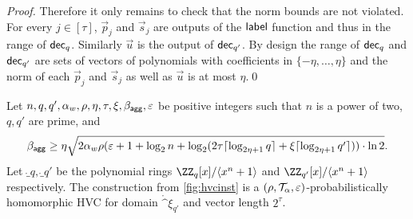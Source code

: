 \begin{proof}
Therefore it only remains to check that the norm bounds are not violated. For every $j\in[\tau]$, $\vec{p}_j$ and $\vec{s}_j$ are outputs of the $\mathsf{label}$ function and thus in the range of $\mathsf{dec}_q$.
Similarly $\vec{u}$ is the output of $\mathsf{dec}_{q'}$.
By design the range of $\mathsf{dec}_q$ and $\mathsf{dec}_{q'}$ are sets of vectors of polynomials with coefficients in $\{-\eta,\dots,\eta\}$ and the norm of each $\vec{p}_j$ and $\vec{s}_j$ as well as $\vec{u}$ is at most $\eta$.\qed
\end{proof}

\begin{lemma}\label{lem:hvcprobhom}
  Let $n,q,q',\alpha_w,\rho,\eta,\tau,\xi,\beta_{\mathsf{agg}},\varepsilon$ be positive integers such that $n$ is a power of two, $q,q'$ are prime, and \[\beta_{\mathsf{agg}} \geq \eta\sqrt{2\alpha_w\rho(\varepsilon+1+\log_2 n + \log_2(2\tau \lceil\log_{2\eta+1}q\rceil + \xi\lceil\log_{2\eta+1}q'\rceil))\cdot\ln2}.\]
  Let $\ring_q,\ring_{q'}$ be the polynomial rings $\ZZ_q[x]/\langle x^n+1\rangle$ and $\ZZ_{q'}[x]/\langle x^n+1\rangle$ respectively.
  The construction from \autoref{fig:hvcinst} is a $(\rho,\mathcal{T}_\alpha,\varepsilon)$-probabilistically homomorphic HVC for domain $\ring^\xi_{q'}$ and vector length $2^\tau$.
\end{lemma}
